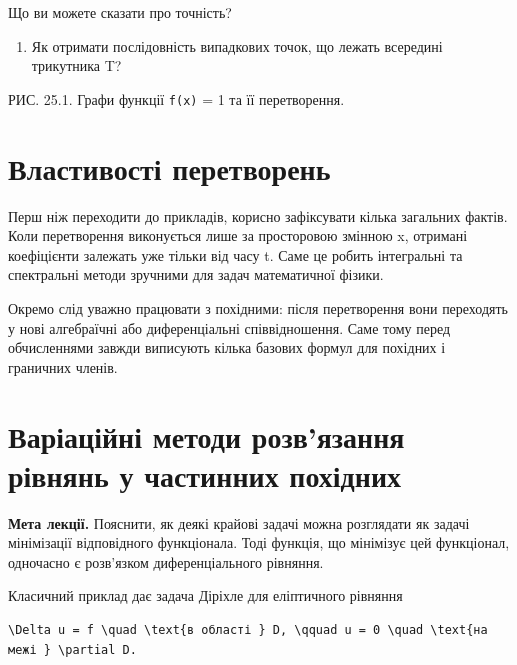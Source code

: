 \documentclass[
  ukrainian,
]{article}
\providecommand{\tightlist}{%
  \setlength{\itemsep}{0pt}\setlength{\parskip}{0pt}}
\begin{document}
Що ви можете сказати про точність?

\begin{enumerate}
\def\labelenumi{\arabic{enumi}.}
\setcounter{enumi}{3}
\tightlist
\item
  Як отримати послідовність випадкових точок, що лежать всередині
  трикутника T?
\end{enumerate}

РИС. 25.1. Графи функції \texttt{f(x)} = 1 та її перетворення.

\section{Властивості
перетворень}\label{ux432ux43bux430ux441ux442ux438ux432ux43eux441ux442ux456-ux43fux435ux440ux435ux442ux432ux43eux440ux435ux43dux44c}

Перш ніж переходити до прикладів, корисно зафіксувати кілька загальних
фактів. Коли перетворення виконується лише за просторовою змінною x,
отримані коефіцієнти залежать уже тільки від часу t. Саме це робить
інтегральні та спектральні методи зручними для задач математичної
фізики.

Окремо слід уважно працювати з похідними: після перетворення вони
переходять у нові алгебраїчні або диференціальні співвідношення. Саме
тому перед обчисленнями завжди виписують кілька базових формул для
похідних і граничних членів.

\section{Варіаційні методи розв'язання рівнянь у частинних
похідних}\label{ux432ux430ux440ux456ux430ux446ux456ux439ux43dux456-ux43cux435ux442ux43eux434ux438-ux440ux43eux437ux432ux44fux437ux430ux43dux43dux44f-ux440ux456ux432ux43dux44fux43dux44c-ux443-ux447ux430ux441ux442ux438ux43dux43dux438ux445-ux43fux43eux445ux456ux434ux43dux438ux445}

\textbf{Мета лекції.} Пояснити, як деякі крайові задачі можна розглядати
як задачі мінімізації відповідного функціонала. Тоді функція, що
мінімізує цей функціонал, одночасно є розв'язком диференціального
рівняння.

Класичний приклад дає задача Діріхле для еліптичного рівняння

\begin{verbatim}
\Delta u = f \quad \text{в області } D, \qquad u = 0 \quad \text{на межі } \partial D.
\end{verbatim}
\end{document}

